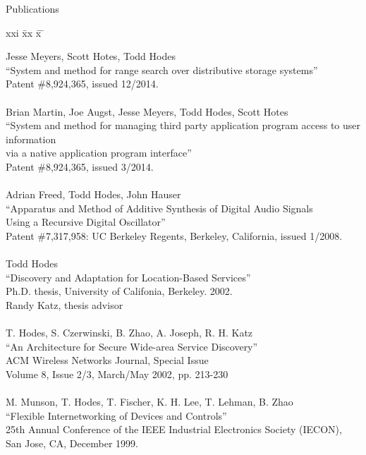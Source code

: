 \begin{bf} \large
Publications
\end{bf}
\begin{tabbing}
xxi \= xx \= x \= \kill

\>    Jesse Meyers, Scott Hotes, Todd Hodes \\
\>\>      ``System and method for range search over distributive storage systems'' \\
\>\>    Patent \#8,924,365, issued 12/2014. \\

\smallskip \\[-3pt]
\>    Brian Martin, Joe Augst, Jesse Meyers, Todd Hodes, Scott Hotes \\
\>\>      ``System and method for managing third party application program access to user information \\
\>\>      via a native application program interface'' \\
\>\>    Patent \#8,924,365,    issued 3/2014. \\

\smallskip \\[-3pt]
\>    Adrian Freed, Todd Hodes, John Hauser \\
\>\>      ``Apparatus and Method of Additive Synthesis of Digital Audio Signals \\
\>\>   Using a Recursive Digital Oscillator'' \\
\>\>    Patent \#7,317,958: UC Berkeley Regents, Berkeley, California, issued 1/2008. \\

\smallskip \\[-3pt]
\>    Todd Hodes \\
\>\>      ``Discovery and Adaptation for Location-Based Services'' \\
\>\>    Ph.D. thesis, University of Califonia, Berkeley. 2002. \\
\>\>    Randy Katz, thesis advisor \\

\smallskip \\[-3pt]
\>    T. Hodes, S. Czerwinski, B. Zhao, A. Joseph, R. H. Katz \\
\>\>      ``An Architecture for Secure Wide-area Service Discovery'' \\
\>\>       ACM Wireless Networks Journal, Special Issue \\
\>\>       Volume 8, Issue 2/3, March/May 2002, pp. 213-230 \\

\smallskip \\[-3pt]
\>   M. Munson, T. Hodes, T. Fischer, K. H. Lee, T. Lehman, B. Zhao \\
\>\>      ``Flexible Internetworking of Devices and Controls'' \\
\>\>        25th Annual Conference of the IEEE Industrial Electronics Society (IECON),  \\
\>\>	    San Jose, CA, December 1999. \\

\end{tabbing}
